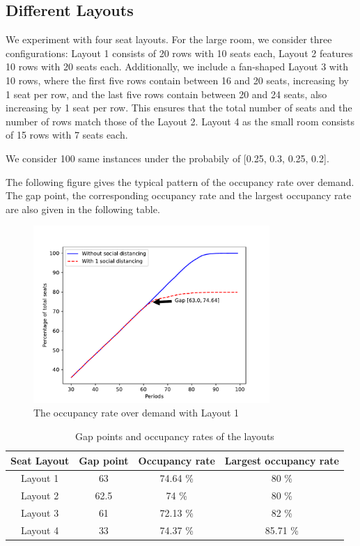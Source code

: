 \subsection*{Different Layouts}
We experiment with four seat layouts. For the large room, we consider three configurations: Layout 1 consists of 20 rows with 10 seats each, Layout 2 features 10 rows with 20 seats each. Additionally, we include a fan-shaped Layout 3 with 10 rows, where the first five rows contain between 16 and 20 seats, increasing by 1 seat per row, and the last five rows contain between 20 and 24 seats, also increasing by 1 seat per row. This ensures that the total number of seats and the number of rows match those of the Layout 2. Layout 4 as the small room consists of 15 rows with 7 seats each.  

We consider 100 same instances under the probabily of [0.25, 0.3, 0.25, 0.2].

The following figure gives the typical pattern of the occupancy rate over demand. The gap point,  the corresponding occupancy rate and the largest occupancy rate are also given in the following table.  


\begin{figure}[h]
  \centering
    \includegraphics[width=0.8\textwidth]{./Figures/layout20.pdf}
  \caption{The occupancy rate over demand with Layout 1}
\end{figure}

\begin{table}[ht]
  \centering
  \caption{Gap points and occupancy rates of the layouts}
  \begin{tabular}{|c|c|c|c|}
  \hline
   Seat Layout & Gap point & Occupancy rate & Largest occupancy rate \\
  \hline
   Layout 1 & 63  & 74.64 \% & 80 \% \\
   Layout 2 & 62.5 & 74 \% & 80 \%  \\ 
   Layout 3 & 61 & 72.13 \% & 82 \% \\
   Layout 4 & 33 & 74.37 \% & 85.71 \%  \\
   \hline
  \end{tabular}
\end{table}

